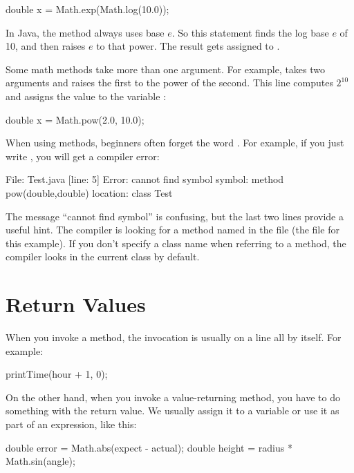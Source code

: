 \begin{code}
double x = Math.exp(Math.log(10.0));
\end{code}

In Java, the  method always uses base $e$.
So this statement finds the log base $e$ of 10, and then raises $e$ to that power.
The result gets assigned to .

Some math methods take more than one argument.
For example,  takes two arguments and raises the first to the power of the second.
This line computes $2^{10}$ and assigns the value  to the variable :

\begin{code}
double x = Math.pow(2.0, 10.0);
\end{code}

When using  methods, beginners often forget the word .
For example, if you just write , you will get a compiler error:

\begin{stdout}
File: Test.java  [line: 5]
Error: cannot find symbol
  symbol:   method pow(double,double)
  location: class Test
\end{stdout}

The message ``cannot find symbol'' is confusing, but the last two lines provide a useful hint.
The compiler is looking for a method named  in the file  (the file for this example).
If you don't specify a class name when referring to a method, the compiler looks in the current class by default.


\section{Return Values}


When you invoke a  method, the invocation is usually on a line all by itself.
For example:

\begin{code}
printTime(hour + 1, 0);
\end{code}

On the other hand, when you invoke a value-returning method, you have to do something with the return value.
We usually assign it to a variable or use it as part of an expression, like this:

\begin{code}
double error = Math.abs(expect - actual);
double height = radius * Math.sin(angle);
\end{code}

